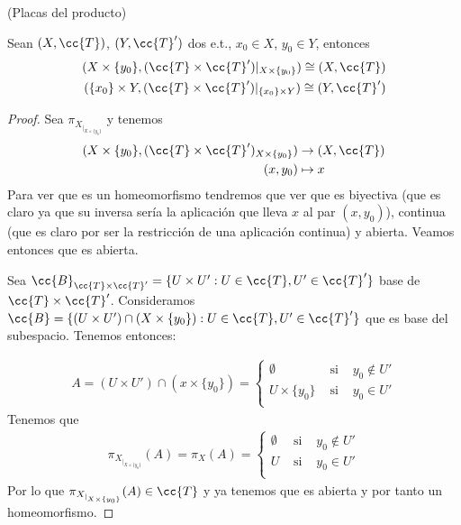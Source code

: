 \begin{prop}(Placas del producto)\ 

    Sean $(X, \cc{T})$, $(Y, \cc{T}')$ dos e.t., $x_0\in X$, $y_0\in Y$, entonces
    \begin{align*}
        (X\times \{y_0\}, (\cc{T}\times \cc{T}')|_{X\times\{y_0\}})\cong (X, \cc{T})\\
        (\{x_0\}\times Y, (\cc{T}\times \cc{T}')|_{\{x_0\}\times Y})\cong (Y, \cc{T}')
    \end{align*}

    \begin{proof}
        Sea $\pi_{X_{|_{X\times \{y_0\}}}}$ y tenemos
        \begin{align*}
            (X\times \{y_0\}, (\cc{T}\times \cc{T}')_{X\times \{y_0\}}) &\to (X, \cc{T})\\
            (x,y_0) &\mapsto x
        \end{align*}
        Para ver que es un homeomorfismo tendremos que ver que es biyectiva (que es claro ya que su inversa sería la aplicación que lleva $x$ al par $(x,y_0)$), continua (que es claro por ser la restricción de una aplicación continua) y abierta. Veamos entonces que es abierta.

        Sea $\cc{B}_{\cc{T}\times \cc{T}'}=\{U\times U': U\in \cc{T}, U'\in \cc{T}'\}$ base de $\cc{T}\times \cc{T}'$. Consideramos $\cc{B}=\{(U\times U')\cap (X\times \{y_0\}): U\in \cc{T}, U'\in \cc{T}'\}$ que es base del subespacio. Tenemos entonces:
        
        \begin{align*}
            A=(U\times U')\cap (x\times \{y_0\}) = \left\{
            \begin{array}{lcc}
                \emptyset & \text{ si } & y_0\notin U'\\
                U\times \{y_0\} & \text{ si } & y_0\in U'\\
            \end{array}
            \right.
        \end{align*}
        Tenemos que
        \begin{align*}
            \pi_{X_{|_{X\times\{y_0\}}}} (A) = \pi_X(A) = \left\{
                \begin{array}{lcc}
                    \emptyset & \text{ si } & y_0\notin U'\\
                    U & \text{ si } & y_0\in U'\\
                \end{array}
                \right.
        \end{align*}
        Por lo que $\pi_{X_{|_{X\times\{y_0\}}}} (A)\in \cc{T}$ y ya tenemos que es abierta y por tanto un homeomorfismo.
    \end{proof}
\end{prop}


